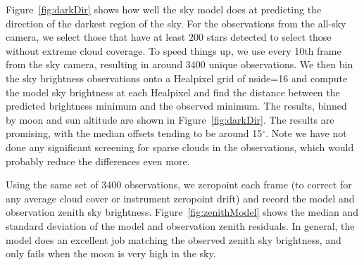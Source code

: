 \documentclass[]{spie}
\newcommand\degree{{^\circ}}
\begin{document}
Figure~\ref{fig:darkDir} shows how well the sky model does at predicting the direction of the darkest region of the sky.  For the observations from the all-sky camera, we select those that have at least 200 stars detected to select those without extreme cloud coverage. To speed things up, we use every 10th frame from the sky camera, resulting in around 3400 unique observations.  We then bin the sky brightness observations onto a Healpixel grid of nside=16 and compute the model sky brightness at each Healpixel and find the distance between the predicted brightness minimum and the observed minimum.  The results, binned by moon and sun altitude are shown in Figure~\ref{fig:darkDir}.  The results are promising, with the median offsets tending to be around 15$\degree$.  Note we have not done any significant screening for sparse clouds in the observations, which would probably reduce the differences even more. 

Using the same set of 3400 observations, we zeropoint each frame (to correct for any average cloud cover or instrument zeropoint drift) and record the model and observation zenith sky brightness. Figure~\ref{fig:zenithModel} shows the median and standard deviation of the model and observation zenith residuals.  In general, the model does an excellent job matching the observed zenith sky brightness, and only fails when the moon is very high in the sky.  
\end{document}
